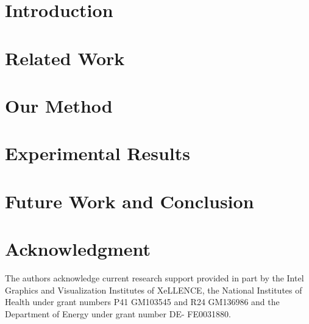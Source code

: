 \section{Introduction}
\label{sec:introduction}


\section{Related Work}
\label{sec:related}


\section{Our Method}
\label{sec:method}


\section{Experimental Results}
\label{sec:results}



\section{Future Work and Conclusion}
\label{sec:conclusion}


\section*{Acknowledgment}
The authors acknowledge current research support provided in part by the Intel Graphics and Visualization Institutes of XeLLENCE, the National Institutes of Health under grant numbers P41 GM103545 and R24 GM136986 and the Department of Energy under grant number DE- FE0031880.
